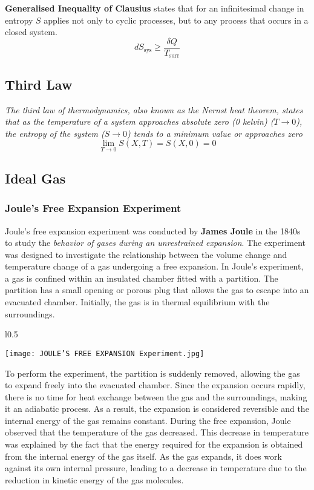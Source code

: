 \documentclass{article}
\begin{document}
\textbf{Generalised Inequality of Clausius} states that for an infinitesimal change in entropy $S$ applies not only to cyclic processes, but to any process that occurs in a closed system.
$$dS_{\text{sys}} \geq \frac{\delta Q}{{T_{\text{surr}}}}$$

 
 \subsection{Third Law}
 
\textit{\large The third law of thermodynamics, also known as the Nernst heat theorem, states that as the temperature of a system approaches absolute zero (0 kelvin) ($T \to 0$), the entropy of the system ($S \to 0 $) tends to a minimum value or approaches zero }
$$\lim_{{T \to 0}} S(X, T) = S(X, 0) = 0 $$

\subsection{Ideal Gas}
\subsubsection{Joule's Free Expansion Experiment}
\large 
Joule's free expansion experiment was conducted by \textbf{James Joule} in the 1840s to study the \textit{behavior of gases during an unrestrained expansion}. The experiment was designed to investigate the relationship between the volume change and temperature change of a gas undergoing a free expansion.
In Joule's experiment, a gas is confined within an insulated chamber fitted with a partition. The partition has a small opening or porous plug that allows the gas to escape into an evacuated chamber. Initially, the gas is in thermal equilibrium with the surroundings.






\begin{wrapfigure}{l}{0.5\textwidth}
  \begin{center}
    \texttt{[image: JOULE'S FREE EXPANSION Experiment.jpg]}
  \end{center}

\end{wrapfigure}


To perform the experiment, the partition is suddenly removed, allowing the gas to expand freely into the evacuated chamber. Since the expansion occurs rapidly, there is no time for heat exchange between the gas and the surroundings, making it an adiabatic process. As a result, the expansion is considered reversible and the internal energy of the gas remains constant.
During the free expansion, Joule observed that the temperature of the gas decreased. This decrease in temperature was explained by the fact that the energy required for the expansion is obtained from the internal energy of the gas itself. As the gas expands, it does work against its own internal pressure, leading to a decrease in temperature due to the reduction in kinetic energy of the gas molecules.
\end{document}
